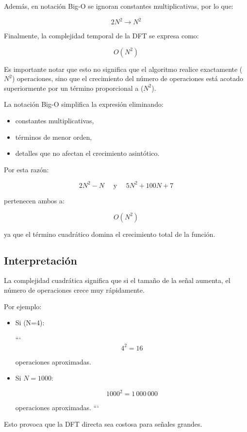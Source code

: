 \documentclass[12pt]{article}
\begin{document}
Además, en notación Big-O se ignoran constantes multiplicativas, por lo que:

$$
2N^2 \rightarrow N^2
$$

Finalmente, la complejidad temporal de la DFT se expresa como:

$$
O(N^2)
$$

Es importante notar que esto no significa que el algoritmo realice exactamente ($N^2$) operaciones, sino que el crecimiento del número de operaciones está acotado superiormente por un término proporcional a ($N^2$).

La notación Big-O simplifica la expresión eliminando:

\begin{itemize}
\item constantes multiplicativas,
\item términos de menor orden,
\item detalles que no afectan el crecimiento asintótico.
\end{itemize}

Por esta razón:

$$
2N^2-N  \quad \text{ y }  \quad  5N^2+100N+7 
$$

pertenecen ambos a:

$$
O(N^2)
$$

ya que el término cuadrático domina el crecimiento total de la función.


\subsection{Interpretación}

La complejidad cuadrática significa que si el tamaño de la señal aumenta, el número de operaciones crece muy rápidamente.

Por ejemplo:

\begin{itemize}
\item Si (N=4):

```
$$
4^2=16
$$

operaciones aproximadas.

\item Si \(N=1000\):

$$
1000^2=1\,000\,000
$$

operaciones aproximadas.
```

\end{itemize}

Esto provoca que la DFT directa sea costosa para señales grandes.
\end{document}
